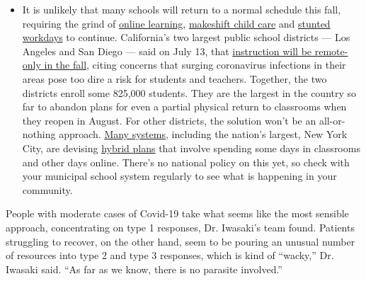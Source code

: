 \begin{itemize}
  \begin{itemize}
  \tightlist
  \item
    It is unlikely that many schools will return to a normal schedule
    this fall, requiring the grind of
    \href{https://www.nytimes3xbfgragh.onion/2020/06/05/us/coronavirus-education-lost-learning.html?action=click\&pgtype=Article\&state=default\&region=MAIN_CONTENT_3\&context=storylines_faq}{online
    learning},
    \href{https://www.nytimes3xbfgragh.onion/2020/05/29/us/coronavirus-child-care-centers.html?action=click\&pgtype=Article\&state=default\&region=MAIN_CONTENT_3\&context=storylines_faq}{makeshift
    child care} and
    \href{https://www.nytimes3xbfgragh.onion/2020/06/03/business/economy/coronavirus-working-women.html?action=click\&pgtype=Article\&state=default\&region=MAIN_CONTENT_3\&context=storylines_faq}{stunted
    workdays} to continue. California's two largest public school
    districts --- Los Angeles and San Diego --- said on July 13, that
    \href{https://www.nytimes3xbfgragh.onion/2020/07/13/us/lausd-san-diego-school-reopening.html?action=click\&pgtype=Article\&state=default\&region=MAIN_CONTENT_3\&context=storylines_faq}{instruction
    will be remote-only in the fall}, citing concerns that surging
    coronavirus infections in their areas pose too dire a risk for
    students and teachers. Together, the two districts enroll some
    825,000 students. They are the largest in the country so far to
    abandon plans for even a partial physical return to classrooms when
    they reopen in August. For other districts, the solution won't be an
    all-or-nothing approach.
    \href{https://bioethics.jhu.edu/research-and-outreach/projects/eschool-initiative/school-policy-tracker/}{Many
    systems}, including the nation's largest, New York City, are
    devising
    \href{https://www.nytimes3xbfgragh.onion/2020/06/26/us/coronavirus-schools-reopen-fall.html?action=click\&pgtype=Article\&state=default\&region=MAIN_CONTENT_3\&context=storylines_faq}{hybrid
    plans} that involve spending some days in classrooms and other days
    online. There's no national policy on this yet, so check with your
    municipal school system regularly to see what is happening in your
    community.
  \end{itemize}
\end{itemize}

People with moderate cases of Covid-19 take what seems like the most
sensible approach, concentrating on type 1 responses, Dr. Iwasaki's team
found. Patients struggling to recover, on the other hand, seem to be
pouring an unusual number of resources into type 2 and type 3 responses,
which is kind of ``wacky,'' Dr. Iwasaki said. ``As far as we know, there
is no parasite involved.''

